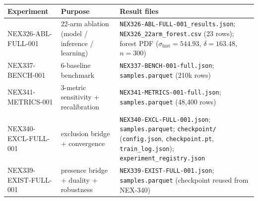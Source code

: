 \documentclass[11pt]{article}
\begin{document}
\begin{center}
\begin{tabular}{p{2.6cm}p{3.4cm}p{4.4cm}}
\toprule
Experiment & Purpose & Result files \\
\midrule
NEX326-ABL-FULL-001 & 22-arm ablation (model / inference / learning) &
\texttt{NEX326-ABL-FULL-001\_results.json};
\texttt{NEX326\_22arm\_forest.csv} (23 rows); forest PDF
($\sigma_{\mathrm{hist}}{=}544.93$, $\delta{=}163.48$, $n{=}300$) \\
NEX337-BENCH-001 & 6-baseline benchmark & \texttt{NEX337-BENCH-001-full.json};
\texttt{samples.parquet} (210k rows) \\
NEX341-METRICS-001 & 3-metric sensitivity + recalibration &
\texttt{NEX341-METRICS-001-full.json}; \texttt{samples.parquet}
(48{,}400 rows) \\
NEX340-EXCL-FULL-001 & exclusion bridge + convergence &
\texttt{NEX340-EXCL-FULL-001.json}; \texttt{samples.parquet};
\texttt{checkpoint/} (\texttt{config.json}, \texttt{checkpoint.pt},
\texttt{train\_log.json}); \texttt{experiment\_registry.json} \\
NEX339-EXIST-FULL-001 & presence bridge + duality + robustness &
\texttt{NEX339-EXIST-FULL-001.json}; \texttt{samples.parquet}
(checkpoint reused from NEX-340) \\
\bottomrule
\end{tabular}
\end{center}
\end{document}
